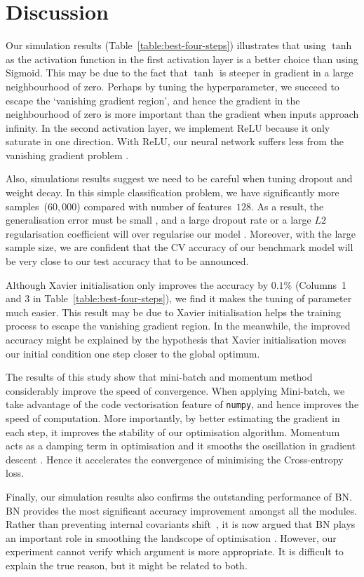 \section{Discussion}

Our simulation results (Table~\ref{table:best-four-steps}) illustrates that using $\tanh$ as the activation function in the first activation layer is a better choice than using Sigmoid. This may be due to the fact that $\tanh$ is steeper in gradient in a large neighbourhood of zero. Perhaps by tuning the hyperparameter, we succeed to escape the `vanishing gradient region', and hence the gradient in the neighbourhood of zero is more important than the gradient when inputs approach infinity. In the second activation layer, we implement ReLU because it only saturate in one direction. With ReLU, our neural network suffers less from the vanishing gradient problem \citep{pmlr-v9-glorot10a}.

Also, simulations results suggest we need to be careful when tuning dropout and weight decay. In this simple classification problem, we have significantly more samples~($60,000$) compared with number of  features~$128$. As a result, the generalisation error must be small \citep{james2013introduction}, and a large dropout rate or a large $L2$ regularisation coefficient will over regularise our model \citep{hastie01statisticallearning}. Moreover, with the large sample size, we are confident that the CV accuracy of our benchmark model will be very close to our test accuracy that to be announced.

Although Xavier initialisation only improves the accuracy by $0.1\%$ (Columns~1 and 3 in Table~\ref{table:best-four-steps}), we find it makes the tuning of parameter much easier. This result may be due to Xavier initialisation helps the training process to escape the vanishing gradient region. In the meanwhile, the improved accuracy might be explained by the hypothesis that Xavier initialisation moves our initial condition one step closer to the global optimum.

The results of this study show that mini-batch and momentum method considerably improve the speed of convergence. When applying Mini-batch, we take advantage of the code vectorisation feature of \texttt{numpy}, and hence improves the speed of computation. More importantly, by better estimating the gradient in each step, it improves the stability of our optimisation algorithm. Momentum acts as a damping term in optimisation and it smooths the oscillation in gradient descent \citep{goh2017why}. Hence it accelerates the convergence of minimising the Cross-entropy loss.

Finally, our simulation results also confirms the outstanding performance of BN. BN provides the most significant accuracy improvement amongst all the modules. Rather than preventing internal covariants shift~\citep{pmlr-v37-ioffe15}, it is now argued that BN plays an important role in smoothing the landscope of optimisation \citep{NIPS20187515}. However, our experiment cannot verify which argument is more appropriate. It is difficult to explain the true reason, but it might be related to both.